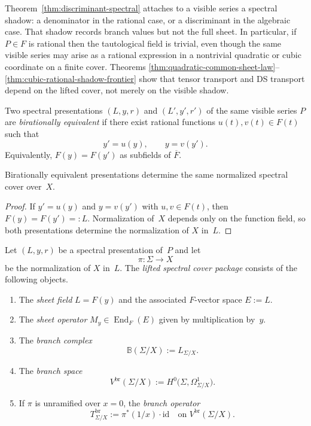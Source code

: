 \begin{remark}
\label{rem:presentation-right-object}
Theorem~\ref{thm:discriminant-spectral} attaches to a visible series a
spectral shadow: a denominator in the rational case, or a discriminant in the
algebraic case.  That shadow records branch values but not the full sheet.  In
particular, if $P\in F$ is rational then the tautological field is trivial, even
though the same visible series may arise as a rational expression in a
nontrivial quadratic or cubic coordinate on a finite cover.  Theorems
\ref{thm:quadratic-common-sheet-law}--\ref{thm:cubic-rational-shadow-frontier}
show that tensor transport and DS transport depend on the lifted cover, not
merely on the visible shadow.
\end{remark}

\begin{definition}
\label{def:equiv-presentations}
Two spectral presentations $(L,y,r)$ and $(L',y',r')$ of the same visible
series $P$ are \emph{birationally equivalent} if there exist rational functions
$u(t),v(t)\in F(t)$ such that
\[
y'=u(y),\qquad y=v(y').
\]
Equivalently, $F(y)=F(y')$ as subfields of $\overline{F}$.
\end{definition}

\begin{proposition}
\label{prop:birational-invariance-cover}
Birationally equivalent presentations determine the same normalized spectral
cover over~$X$.
\end{proposition}

\begin{proof}
If $y'=u(y)$ and $y=v(y')$ with $u,v\in F(t)$, then
$F(y)=F(y')=:L$.  Normalization of~$X$ depends only on the function field, so
both presentations determine the normalization of $X$ in~$L$.
\end{proof}

\begin{construction}
\label{cons:lifted-package}
Let $(L,y,r)$ be a spectral presentation of~$P$ and let
\[
\pi\colon \Sigma\to X
\]
be the normalization of $X$ in~$L$.  The \emph{lifted spectral cover package}
consists of the following objects.
\begin{enumerate}[label=\textup{(\roman*)}]
\item The \emph{sheet field} $L=F(y)$ and the associated
$F$-vector space $E:=L$.
\item The \emph{sheet operator}
$M_y\in \operatorname{End}_F(E)$ given by multiplication by~$y$.
\item The \emph{branch complex}
\[
\mathbb B(\Sigma/X):=L_{\Sigma/X}.
\]
\item The \emph{branch space}
\[
V^{\mathrm{br}}(\Sigma/X):=H^0\bigl(\Sigma,\Omega^1_{\Sigma/X}\bigr).
\]
\item If $\pi$ is unramified over $x=0$, the \emph{branch operator}
\[
T^{\mathrm{br}}_{\Sigma/X}:=\pi^*(1/x)\cdot \mathrm{id}
\quad\text{on }V^{\mathrm{br}}(\Sigma/X).
\]
\end{enumerate}
\end{construction}

